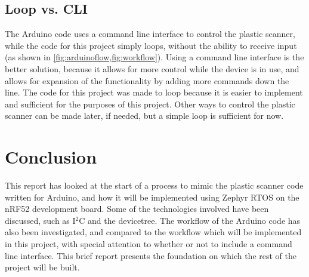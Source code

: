 \documentclass[12pt, a4paper]{article}
\begin{document}
            \subsection{Loop vs. CLI}
                The Arduino code uses a command line interface to control the plastic scanner,
                while the code for this project simply loops, without the ability to receive input (as
                shown in \cref{fig:arduinoflow,fig:workflow}). Using a command line interface is the
                better solution, because it allows for more control while the device is in use, and allows
                for expansion of the functionality by adding more commands down the line. The code for this
                project was made to loop because it is easier to implement and sufficient for the purposes of this project.
                Other ways to control the plastic
                scanner can be made later, if needed, but a simple loop is sufficient for now.

        \section{Conclusion}

            This report has looked at the start of a process to mimic the plastic scanner code written for Arduino, and how it will be implemented using Zephyr RTOS on
            the nRF52 development board. Some of the technologies involved have been discussed, such as I$^2$C and the devicetree.
            The workflow of the Arduino code has also been investigated, and compared to the workflow which will
            be implemented in this project, with special attention to whether or not to include a command line interface.
            This brief report presents the foundation on which the rest of the project will be built.





    \clearpage
    
    
\end{document}
